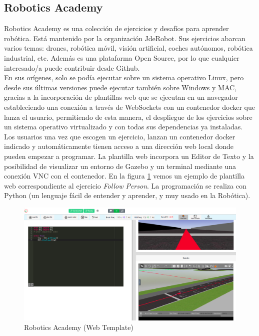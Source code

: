 \subsection{Robotics Academy}
\label{sec:robotics_academy}
Robotics Academy \cite{robotics-academy} es una colección de ejercicios y desafíos para aprender robótica. Está mantenido por la organización JdeRobot. Sus ejercicios abarcan varios temas: drones, robótica móvil, visión artificial, coches autónomos, robótica industrial, etc. Además es una plataforma Open Source, por lo que cualquier interesado/a puede contribuir desde Github.\\

En sus orígenes, solo se podía ejecutar sobre un sistema operativo Linux, pero desde sus últimas versiones puede ejecutar también sobre Windows y MAC, gracias a la incorporación de plantillas web que se ejecutan en un navegador estableciendo una conexión a través de WebSockets con un contenedor docker que lanza el usuario, permitiendo de esta manera, el despliegue de los ejercicios sobre un sistema operativo virtualizado y con todas sus dependencias ya instaladas.\\

Los usuarios una vez que escogen un ejercicio, lanzan un contenedor docker indicado y automáticamente tienen acceso a una dirección web local donde pueden empezar a programar. La plantilla web incorpora un Editor de Texto y la posibilidad de visualizar un entorno de Gazebo y un terminal mediante una conexión VNC con el contenedor. En la figura \ref{fig:rob-ac-web-template} vemos un ejemplo de plantilla web correspondiente al ejercicio \textit{Follow Person}. La programación se realiza con Python (un lenguaje fácil de entender y aprender, y muy usado en la Robótica).\\

\begin{figure} [h!]
  \begin{center}
    \includegraphics[width=15cm]{imagenes/robotics-academy-web-template.png}
  \end{center}
  \caption[Robotics Academy (Web Template)]{Robotics Academy (Web Template)}
  \label{fig:rob-ac-web-template}
\end{figure}

